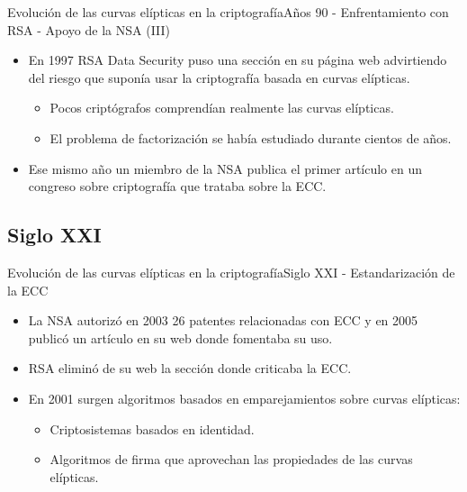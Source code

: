 \documentclass[spanish]{beamer}
\begin{document}
\begin{frame}[fragile]{Evolución de las curvas elípticas en la criptografía}{Años 90 - Enfrentamiento con RSA - Apoyo de la NSA (III)}
    \begin{itemize}
    \item En 1997 RSA Data Security puso una sección en su página web advirtiendo del riesgo que suponía usar la criptografía basada en curvas elípticas.
    \begin{itemize}
        \item Pocos criptógrafos comprendían realmente las curvas elípticas.
	    \item El problema de factorización se había estudiado durante cientos de años.
\end{itemize}
    \item Ese mismo año un miembro de la NSA publica
    el primer artículo en un congreso sobre criptografía que trataba sobre la ECC.
  \end{itemize}
\end{frame}

\subsection{Siglo XXI}
 \begin{frame}[fragile]{Evolución de las curvas elípticas en la criptografía}{Siglo XXI - Estandarización de la ECC}
    \begin{itemize}
    \item La NSA autorizó en 2003 26 patentes relacionadas
con ECC y en 2005 publicó un artículo en su web donde fomentaba su uso.
    \item RSA eliminó de su web la sección donde criticaba la ECC.
    \item En 2001 surgen algoritmos basados en emparejamientos sobre curvas elípticas: %
    \begin{itemize}
	    \item Criptosistemas basados en identidad.
	    \item Algoritmos de firma que aprovechan las propiedades de las curvas elípticas.
    \end{itemize}
  \end{itemize}
\end{frame}
\end{document}
